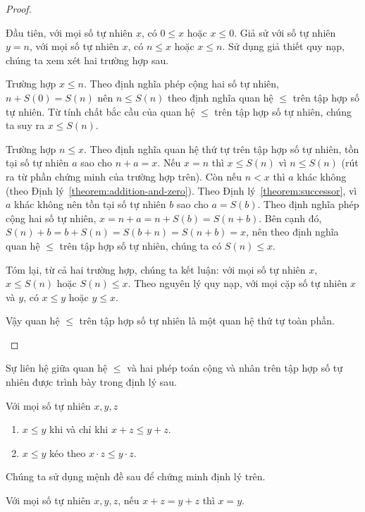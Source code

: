 \begin{proof}
\begin{enumerate}[label={(\roman*)}]
		      Đầu tiên, với mọi số tự nhiên $x$, có $0\leq x$ hoặc $x\leq 0$. Giả sử với số tự nhiên $y = n$, với mọi số tự nhiên $x$, có $n\leq x$ hoặc $x\leq n$. Sử dụng giả thiết quy nạp, chúng ta xem xét hai trường hợp sau.

		      Trường hợp $x\leq n$. Theo định nghĩa phép cộng hai số tự nhiên, $n + S(0) = S(n)$ nên $n\leq S(n)$ theo định nghĩa quan hệ $\leq$ trên tập hợp số tự nhiên. Từ tính chất bắc cầu của quan hệ $\leq$ trên tập hợp số tự nhiên, chúng ta suy ra $x\leq S(n)$.

		      Trường hợp $n\leq x$. Theo định nghĩa quan hệ thứ tự trên tập hợp số tự nhiên, tồn tại số tự nhiên $a$ sao cho $n + a = x$. Nếu $x = n$ thì $x\leq S(n)$ vì $n\leq S(n)$ (rút ra từ phần chứng minh của trường hợp trên). Còn nếu $n < x$ thì $a$ khác không (theo Định lý~\ref{theorem:addition-and-zero}). Theo Định lý~\ref{theorem:successor}, vì $a$ khác không nên tồn tại số tự nhiên $b$ sao cho $a = S(b)$. Theo định nghĩa phép cộng hai số tự nhiên, $x = n + a = n + S(b) = S(n + b)$. Bên cạnh đó, $S(n) + b = b + S(n) = S(b + n) = S(n + b) = x$, nên theo định nghĩa quan hệ $\leq$ trên tập hợp số tự nhiên, chúng ta có $S(n)\leq x$.

		      Tóm lại, từ cả hai trường hợp, chúng ta kết luận: với mọi số tự nhiên $x$, $x\leq S(n)$ hoặc $S(n)\leq x$. Theo nguyên lý quy nạp, với mọi cặp số tự nhiên $x$ và $y$, có $x\leq y$ hoặc $y\leq x$.

		      Vậy quan hệ $\leq$ trên tập hợp số tự nhiên là một quan hệ thứ tự toàn phần.\qedhere
	\end{enumerate}
\end{proof}

Sự liên hệ giữa quan hệ $\leq$ và hai phép toán cộng và nhân trên tập hợp số tự nhiên được trình bày trong định lý sau.
\begin{theorem}\label{theorem:natural-numbers-order}
	Với mọi số tự nhiên $x, y, z$
	\begin{enumerate}[label={(\roman*)}]
		\item $x\leq y$ khi và chỉ khi $x + z\leq y + z$.
		\item $x\leq y$ kéo theo $x\cdot z\leq y\cdot z$.
	\end{enumerate}
\end{theorem}

\noindent Chúng ta sử dụng mệnh đề sau để chứng minh định lý trên.

\begin{proposition}\label{proposition:addition-cancellation}
	Với mọi số tự nhiên $x, y, z$, nếu $x + z = y + z$ thì $x = y$.
\end{proposition}

